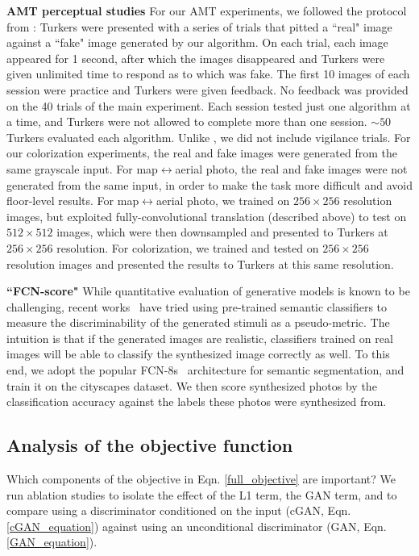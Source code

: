 {\bf AMT perceptual studies} For our AMT experiments, we followed the protocol from \cite{zhang2016colorful}: Turkers were presented with a series of trials that pitted a ``real" image against a ``fake" image generated by our algorithm. On each trial, each image appeared for 1 second, after which the images disappeared and Turkers were given unlimited time to respond as to which was fake. The first 10 images of each session were practice and Turkers were given feedback. No feedback was provided on the 40 trials of the main experiment. Each session tested just one algorithm at a time, and Turkers were not allowed to complete more than one session. $\sim 50$ Turkers evaluated each algorithm. Unlike \cite{zhang2016colorful}, we did not include vigilance trials. For our colorization experiments, the real and fake images were generated from the same grayscale input. For map$\leftrightarrow$aerial photo, the real and fake images were not generated from the same input, in order to make the task more difficult and avoid floor-level results. For map$\leftrightarrow$aerial photo, we trained on $256 \times 256$ resolution images, but exploited fully-convolutional translation (described above) to test on $512 \times 512$ images, which were then downsampled and presented to Turkers at $256 \times 256$ resolution. For colorization, we trained and tested on $256 \times 256$ resolution images and presented the results to Turkers at this same resolution.

{\bf ``FCN-score"} While quantitative evaluation of generative models is known to be challenging, recent works~\cite{salimans2016improved, wang2016generative, zhang2016colorful,owens2016visually} have tried using pre-trained semantic classifiers to measure the discriminability of the generated stimuli as a pseudo-metric. The intuition is that if the generated images are realistic, classifiers trained on real images will be able to classify the synthesized image correctly as well. To this end, we adopt the popular FCN-8s~\cite{long2015fully} architecture for semantic segmentation, and train it on the cityscapes dataset. We then score synthesized photos by the classification accuracy against the labels these photos were synthesized from.

\subsection{Analysis of the objective function}

Which components of the objective in Eqn. \ref{full_objective} are important? We run ablation studies to isolate the effect of the L1 term, the GAN term, and to compare using a discriminator conditioned on the input (cGAN, Eqn. \ref{cGAN_equation}) against using an unconditional discriminator (GAN, Eqn. \ref{GAN_equation}).

